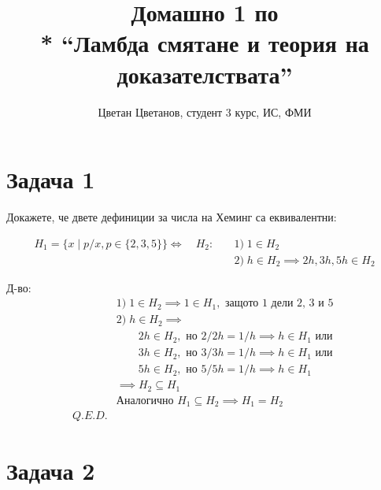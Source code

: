 \documentclass[a4paper]{article}
\title{Домашно 1 по \\* ``Ламбда смятане и теория на доказателствата''}
\author{Цветан Цветанов, студент 3 курс, ИС, ФМИ}
\begin{document}
\maketitle
\thispagestyle{empty}
\newpage

\section*{Задача 1}

Докажете, че двете дефиниции за числа на Хеминг са еквивалентни:

\begin{align*}
H_{1} = \{ x \mid p/x, p \in \{2, 3, 5\}\} \iff \quad H_{2}: \quad & 1)\; 1 \in H_{2} \\
                                                                   & 2)\; h \in H_{2} \implies 2h, 3h, 5h \in H_{2}
\end{align*}

Д-во:
\begin{align*}
& 1)\; 1 \in H_{2} \implies 1 \in H_{1}, \text{ защото 1 дели 2, 3 и 5 } \\
& 2)\; h \in H_{2} \implies \\ 
      & \qquad 2h \in H_{2}, \text{ но } 2/2h = 1/h \implies h \in H_{1} \text{ или} \\
      & \qquad 3h \in H_{2}, \text{ но } 3/3h = 1/h \implies h \in H_{1} \text{ или} \\
      & \qquad 5h \in H_{2}, \text{ но } 5/5h = 1/h \implies h \in H_{1} \\
      & \implies H_{2} \subseteq H_{1} \\
& \text{Аналогично } H_{1} \subseteq H_{2} \implies H_{1} = H_{2} \\
Q.E.D.
\end{align*}

\section*{Задача 2}
\end{document}
